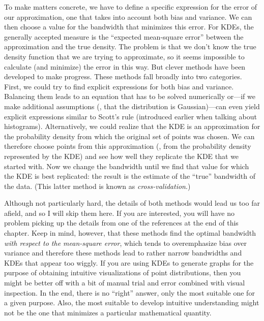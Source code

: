 To make matters concrete, we have to define a specific expression for
the error of our approximation, one that takes into account both bias
and variance. We can then choose a value for the bandwidth that
minimizes this error. For KDEs, the generally accepted measure is the
``expected mean-square error''  between the approximation and the true
density.  The problem is that we don't know the true density function
that we are trying to approximate, so it seems impossible to calculate
(and minimize) the error in this way. But clever methods have been
developed to make progress. These methods fall broadly into two
categories. First, we could try to find explicit expressions for
both bias and variance.  Balancing them leads to an equation that has
to be solved numerically or---if we make additional assumptions (\eg,
that the distribution is Gaussian)---can even yield explicit
expressions similar to Scott's rule (introduced earlier when talking
about histograms).  Alternatively, we could realize that the KDE is an
approximation for the probability density from which the original set
of points was chosen. We can therefore choose points from this
approximation (\ie, from the probability density represented by
the KDE) and see how well they replicate the KDE that we started with.
Now we change the bandwidth until we find that value for which the KDE
is best replicated: the result is the estimate of the ``true''
bandwidth of the data. (This latter method is known as
\emph{cross-validation}.)

Although not particularly hard, the details of both methods would lead
us too far afield, and so I will skip them here.\vadjust{\pagebreak}  If you are
interested, you will have no problem picking up the details from one
of the references at the end of this chapter.  Keep in mind, however,
that these methods find the optimal bandwidth \emph{with respect to
  the mean-square error}, which tends to overemphasize bias over variance and therefore
these methods lead to rather narrow bandwidths and KDEs that appear
too wiggly. If you are using KDEs to generate graphs for
the purpose of obtaining intuitive visualizations of point
distributions, then you might be better off with a bit of manual trial
and error combined with visual inspection.  In the end, there is no
``right'' answer, only the most suitable one for a given purpose.
Also, the most suitable to develop intuitive understanding might not
be the one that minimizes a particular mathematical quantity.


